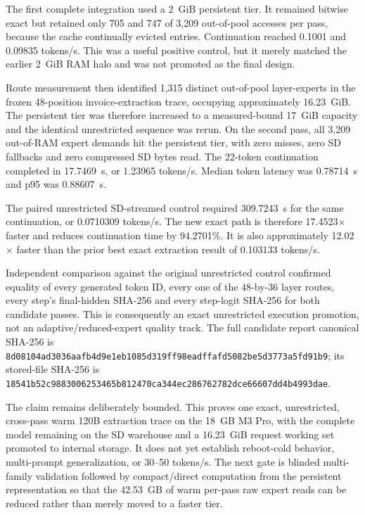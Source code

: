 The first complete integration used a 2~GiB persistent tier.  It remained
bitwise exact but retained only 705 and 747 of 3,209 out-of-pool accesses per
pass, because the cache continually evicted entries.  Continuation reached
0.1001 and 0.09835 tokens/s.  This was a useful positive control, but it merely
matched the earlier 2~GiB RAM halo and was not promoted as the final design.

Route measurement then identified 1,315 distinct out-of-pool layer-experts in
the frozen 48-position invoice-extraction trace, occupying approximately
16.23~GiB.  The persistent tier was therefore increased to a measured-bound
17~GiB capacity and the identical unrestricted sequence was rerun.  On the
second pass, all 3,209 out-of-RAM expert demands hit the persistent tier, with
zero misses, zero SD fallbacks and zero compressed SD bytes read.  The 22-token
continuation completed in 17.7469~s, or 1.23965 tokens/s.  Median token latency
was 0.78714~s and p95 was 0.88607~s.

The paired unrestricted SD-streamed control required 309.7243~s for the same
continuation, or 0.0710309 tokens/s.  The new exact path is therefore
17.4523$\times$ faster and reduces continuation time by 94.2701\%.  It is also
approximately 12.02$\times$ faster than the prior best exact extraction result
of 0.103133 tokens/s.

Independent comparison against the original unrestricted control confirmed
equality of every generated token ID, every one of the 48-by-36 layer routes,
every step's final-hidden SHA-256 and every step-logit SHA-256 for both
candidate passes.  This is consequently an exact unrestricted execution
promotion, not an adaptive/reduced-expert quality track.  The full candidate
report canonical SHA-256 is
\texttt{8d08104ad3036aafb4d9e1eb1085d319ff98eadffafd5082be5d3773a5fd91b9};
its stored-file SHA-256 is
\texttt{18541b52c9883006253465b812470ca344ec286762782dce66607dd4b4993dae}.

The claim remains deliberately bounded.  This proves one exact, unrestricted,
cross-pass warm 120B extraction trace on the 18~GB M3 Pro, with the complete
model remaining on the SD warehouse and a 16.23~GiB request working set
promoted to internal storage.  It does not yet establish reboot-cold behavior,
multi-prompt generalization, or 30--50 tokens/s.  The next gate is blinded
multi-family validation followed by compact/direct computation from the
persistent representation so that the 42.53~GB of warm per-pass raw expert
reads can be reduced rather than merely moved to a faster tier.

